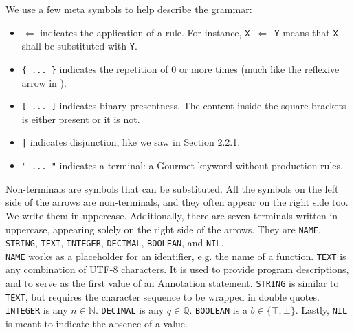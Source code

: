 We use a few meta symbols to help describe the grammar:

\begin{itemize}
    \item $\Leftarrow$ indicates the application of a rule. For instance, \texttt{X $\Leftarrow$ Y} means that \texttt{X} shall be substituted with \texttt{Y}.
    \item \texttt{\{ ... \}} indicates the repetition of 0 or more times (much like the reflexive arrow in ).
    \item  \texttt{[ ... ]} indicates binary presentness. The content inside the square brackets is either present or it is not.
    \item \texttt{|} indicates disjunction, like we saw in Section 2.2.1.
    \item \texttt{" ... "} indicates a terminal: a Gourmet keyword without production rules.
\end{itemize}

Non-terminals are symbols that can be substituted. All the symbols on the left side of the arrows are non-terminals, and they often appear on the right side too. We write them in uppercase. Additionally, there are seven terminals written in uppercase, appearing solely on the right side of the arrows. They are \texttt{NAME}, \texttt{STRING}, \texttt{TEXT}, \texttt{INTEGER}, \texttt{DECIMAL}, \texttt{BOOLEAN}, and \texttt{NIL}. \\

\texttt{NAME} works as a placeholder for an identifier, e.g. the name of a function. \texttt{TEXT} is any combination of UTF-8 characters. It is used to provide program descriptions, and to serve as the first value of an Annotation statement. \texttt{STRING} is similar to \texttt{TEXT}, but requires the character sequence to be wrapped in double quotes. \texttt{INTEGER} is any $n \in \mathbb{N}$. \texttt{DECIMAL} is any $q \in \mathbb{Q}$. \texttt{BOOLEAN} is a $b \in \{\top, \bot \}$. Lastly, \texttt{NIL} is meant to indicate the absence of a value. \\

